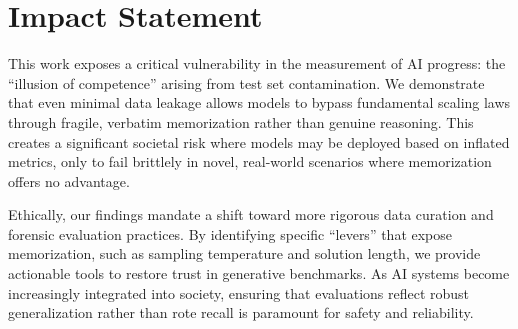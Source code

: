 \section*{Impact Statement}

This work exposes a critical vulnerability in the measurement of AI progress: the ``illusion of competence'' arising from test set contamination. We demonstrate that even minimal data leakage allows models to bypass fundamental scaling laws through fragile, verbatim memorization rather than genuine reasoning. This creates a significant societal risk where models may be deployed based on inflated metrics, only to fail brittlely in novel, real-world scenarios where memorization offers no advantage.

Ethically, our findings mandate a shift toward more rigorous data curation and forensic evaluation practices. By identifying specific ``levers'' that expose memorization, such as sampling temperature and solution length, we provide actionable tools to restore trust in generative benchmarks. As AI systems become increasingly integrated into society, ensuring that evaluations reflect robust generalization rather than rote recall is paramount for safety and reliability.